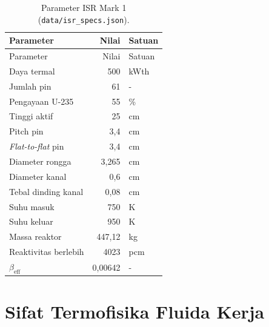 \documentclass[
  indonesian,
  12pt,
  a4paper,
]{report}
\begin{document}
\begin{longtable}[]{@{}lrl@{}}
\caption{Parameter ISR Mark 1
(\protect\texttt{data/isr\_specs.json}).}\label{tbl-isrB}\tabularnewline
\toprule\noalign{}
Parameter & Nilai & Satuan \\
\midrule\noalign{}
\endfirsthead
\toprule\noalign{}
Parameter & Nilai & Satuan \\
\midrule\noalign{}
\endhead
\bottomrule\noalign{}
\endlastfoot
Daya termal & 500 & kWth \\
Jumlah pin & 61 & - \\
Pengayaan U-235 & 55 & \% \\
Tinggi aktif & 25 & cm \\
Pitch pin & 3,4 & cm \\
\emph{Flat-to-flat} pin & 3,4 & cm \\
Diameter rongga & 3,265 & cm \\
Diameter kanal & 0,6 & cm \\
Tebal dinding kanal & 0,08 & cm \\
Suhu masuk & 750 & K \\
Suhu keluar & 950 & K \\
Massa reaktor & 447,12 & kg \\
Reaktivitas berlebih & 4023 & pcm \\
\(\beta_{\mathrm{eff}}\) & 0,00642 & - \\
\end{longtable}

\section{Sifat Termofisika Fluida
Kerja}\label{sifat-termofisika-fluida-kerja-1}
\end{document}
